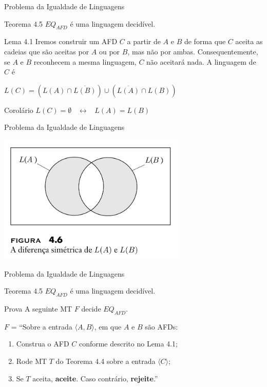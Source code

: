 \documentclass[xcolor=dvipsnames,table]{beamer}
\begin{document}
	\begin{frame}{Problema da Igualdade de Linguagens}
		\begin{block}{Teorema 4.5}
			$EQ_{AFD}$ é uma linguagem decidível.
		\end{block} \pause
		\begin{block}{Lema 4.1}
			Iremos construir um AFD $C$ a partir de $A$ e $B$ de forma que $C$ aceita as cadeias que são aceitas por $A$ ou por $B$, mas não por ambas. Consequentemente, se $A$ e $B$ reconhecem a mesma linguagem, $C$ não aceitará nada. A linguagem de $C$ é
			\begin{center}
				$L(C) = \left( L(A) \cap \overline{L(B)} \right) \cup \left( \overline{L(A)} \cap L(B) \right)$
			\end{center}
		\end{block} \pause
		\begin{block}{Corolário}
			$L(C) = \emptyset$ \ $\leftrightarrow$ \ $L(A) = L(B)$
		\end{block}
	\end{frame}
	
	\begin{frame}{Problema da Igualdade de Linguagens}
		\begin{center}
			\includegraphics[width=9cm]{images/fig46.png}
		\end{center}
	\end{frame}
	
	\begin{frame}{Problema da Igualdade de Linguagens}
		\begin{block}{Teorema 4.5}
			$EQ_{AFD}$ é uma linguagem decidível.
		\end{block} \pause
		\begin{block}{Prova}
			A seguinte MT $F$ decide $EQ_{AFD}$.
			
			$F$ = ``Sobre a entrada $\langle A, B \rangle$, em que $A$ e $B$ são AFDs:
			\begin{enumerate}
				\item Construa o AFD $C$ conforme descrito no Lema 4.1;
				\item Rode MT $T$ do Teorema 4.4 sobre a entrada $\langle C \rangle$;
				\item Se $T$ aceita, {\bf aceite}. Caso contrário, {\bf rejeite}.''
			\end{enumerate}
		\end{block}
	\end{frame}
	
\end{document}
